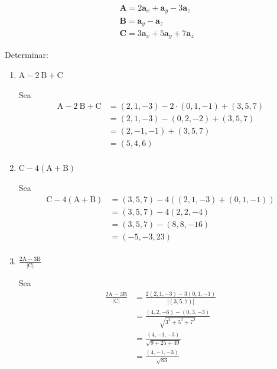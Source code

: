 






\begin{problema}


$$
\begin{aligned}
& \mathbf{A}=2 \mathbf{a}_{x}+\mathbf{a}_{y}-3 \mathbf{a}_{z} \\
& \mathbf{B}=\mathbf{a}_{y}-\mathbf{a}_{z} \\
& \mathbf{C}=3 \mathbf{a}_{x}+5 \mathbf{a}_{y}+7 \mathbf{a}_{z}
\end{aligned}
$$

Determinar:

\begin{enumerate}
    \item $\mathrm{A}-2 \mathrm{~B}+\mathrm{C}$
    \begin{sol}
        Sea 
        \begin{align*}
            \mathrm{A}-2 \mathrm{~B}+\mathrm{C} &= (2,1,-3) -2\cdot (0,1,-1)+(3,5,7)\\
            &= (2,1,-3) - (0,2,-2)+(3,5,7)\\
            &= (2,-1,-1) +(3,5,7)\\
            &= (5,4,6)\\
        \end{align*}
    \end{sol}

    \item $\mathrm{C}-4(\mathrm{A}+\mathrm{B})$
    \begin{sol}
        Sea 
        \begin{align*}
            \mathrm{C}-4(\mathrm{A}+\mathrm{B}) &=(3,5,7)-4((2,1,-3)+(0,1,-1))\\
            &= (3,5,7)-4(2,2,-4)\\
            &= (3,5,7)-(8,8,-16)\\
            &= (-5,-3,23)\\
        \end{align*}
    \end{sol}
    \item $\frac{2 \mathrm{A}-3 \mathrm{B}}{|\mathrm{C}|}$

    \begin{sol}
        Sea
        \begin{align*}
            \frac{2 \mathrm{A}-3 \mathrm{B}}{|\mathrm{C}|} &=\frac{2(2,1,-3)-3(0,1,-1)}{|(3,5,7)|}\\
            &= \frac{(4,2,-6)-(0,3,-3)}{\sqrt{3^2+5^2+7^2}}\\
            &= \frac{(4,-1,-3)}{\sqrt{9+25+49}}\\
            &= \frac{(4,-1,-3)}{\sqrt{83}}\\
        \end{align*}
    \end{sol}


\end{enumerate}
\end{problema}
